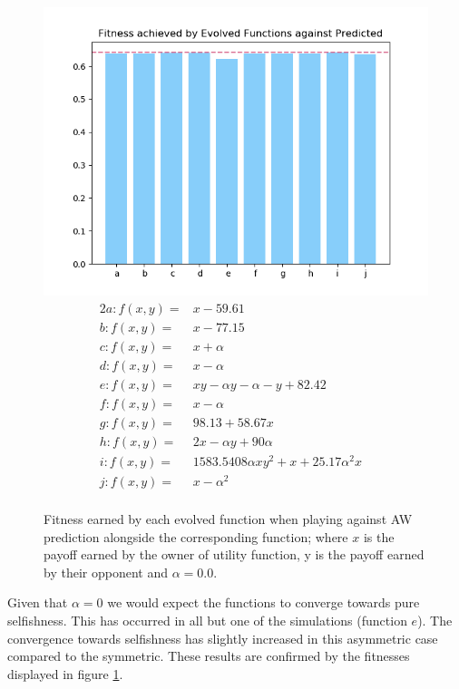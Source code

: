 \documentclass[11pt]{book}
\newcommand*{\np}{\par\noindent\newline}
\begin{document}
\begin{figure}
	\centering
	\includegraphics[scale=0.7]{resources/ylim_barchart_fitness_earned_against_target_asymmetric_r_00.png}
	\begin{alignat*}{2}
		a: f(x, y) = & x - 59.61&\\
		b: f(x, y) = & x - 77.15&\\
		c: f(x, y) = & x + \alpha &\\
		d: f(x, y) = & x - \alpha &\\
		e: f(x, y) = & xy - \alpha y - \alpha  - y + 82.42&\\
		f: f(x, y) = & x - \alpha &\\
		g: f(x, y) = & 98.13 + 58.67x&\\
		h: f(x, y) = & 2x - \alpha y + 90\alpha &\\
		i: f(x, y) = & 1583.5408\alpha xy^2+x+25.17\alpha ^2x&\\
		j: f(x, y) = & x-\alpha ^2&\\
	\end{alignat*}
	\caption{Fitness earned by each evolved function when playing against AW prediction alongside the corresponding function; where $x$ is the payoff earned by the owner of utility function, y is the payoff earned by their opponent and $\alpha = 0.0$.}
	\label{asymmetric_barchart_fitness_earned_against_target_r00}
\end{figure}
\np Given that $\alpha = 0$ we would expect the functions to converge towards pure selfishness.
This has occurred in all but one of the simulations (function $e$).
The convergence towards selfishness has slightly increased in this asymmetric case compared to the symmetric.
These results are confirmed by the fitnesses displayed in figure \ref{asymmetric_barchart_fitness_earned_against_target_r00}.
\end{document}
